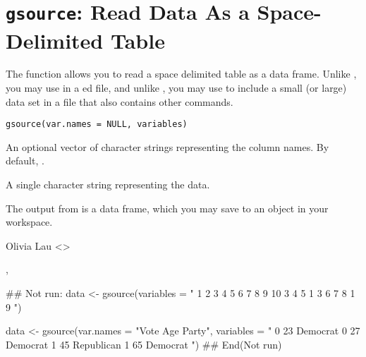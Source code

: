  \section{{\tt gsource}: Read Data As a Space-Delimited Table}\label{ss:gsource}
\begin{Description}\relax
The  function allows you to read a space delimited table
as a data frame.  Unlike , you may use  in a
ed file, and unlike , you may use
 to include a small (or large) data set in a file that
also contains other commands.
\end{Description}
\begin{Usage}
\begin{verbatim}
gsource(var.names = NULL, variables)
\end{verbatim}
\end{Usage}
\begin{Arguments}
\begin{ldescription}
\item[\code{var.names}] An optional vector of character strings representing
the column names.  By default, . 
\item[\code{variables}] A single character string representing the data.
\end{ldescription}
\end{Arguments}
\begin{Value}
The output from  is a data frame, which you may save to
an object in your workspace.
\end{Value}
\begin{Author}\relax
Olivia Lau <>
\end{Author}
\begin{SeeAlso}\relax
{}, 
\end{SeeAlso}
\begin{Examples}
\begin{ExampleCode}
## Not run: 
data <- gsource(variables =  "
                 1 2 3 4 5    
                 6 7 8 9 10   
                 3 4 5 1 3    
                 6 7 8 1 9    ")

data <- gsource(var.names = "Vote Age Party", variables = "
                             0    23 Democrat             
                             0    27 Democrat             
                             1    45 Republican           
                             1    65 Democrat             ")
## End(Not run)
\end{ExampleCode}
\end{Examples}


